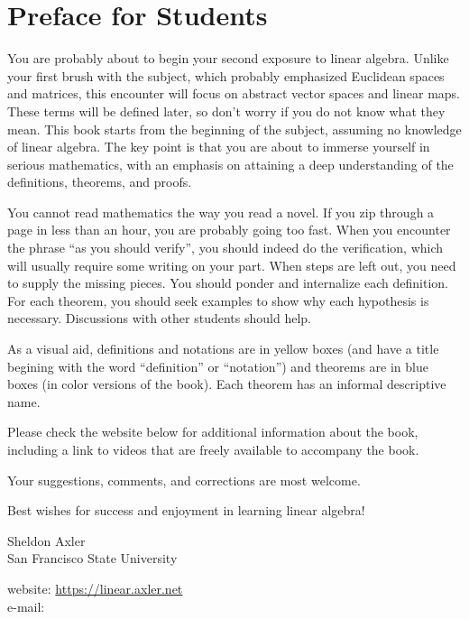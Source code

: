 
\chapter{Preface for Students}

You are probably about to begin your second exposure to linear
algebra. Unlike your first brush with the subject, which probably emphasized
Euclidean spaces and matrices, this encounter will focus on abstract vector
spaces and linear maps. These terms will be defined later, so don't
worry if you do not know what they mean. This book starts from the
beginning of the subject, assuming no knowledge of linear algebra.
The key point is that you are about to immerse yourself in serious
mathematics, with an emphasis on attaining a deep understanding
of the definitions, theorems, and proofs.

You cannot read mathematics the way you read a novel.  If you zip
through a page in less than an hour, you are probably going too fast.
When you encounter the phrase ``as you should verify''\!, you should
indeed do the verification, which will usually require some writing on
your part. When steps are left out, you need to supply the missing
pieces. You should ponder and internalize each definition. For each
theorem, you should seek examples to show why each hypothesis is
necessary. Discussions with other students should help.

As a visual aid, definitions and notations are in yellow boxes (and have a title begining with the word ``{\small\textsf{definition}}'' or ``{\small\textsf{notation}}'') and theorems are in blue boxes (in color versions of the book). Each theorem has an informal descriptive name.



Please check the website below for additional information about the book, including a link to videos that are freely available to accompany the book.

Your suggestions, comments, and corrections are most welcome.

Best wishes for success and enjoyment in learning linear algebra!

\bigskip

{
\setlength{\parindent}{0bp}
Sheldon Axler \\
San Francisco State University

\medskip

website: \url{https://linear.axler.net}\\
e-mail: 
}

